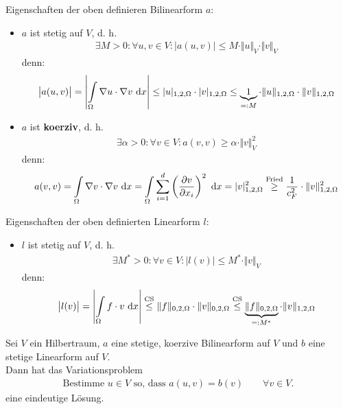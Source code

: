 Eigenschaften der oben definieren Bilinearform $a$:
\begin{itemize}
	\item $a$ ist stetig auf $V$, d. h.
	\begin{align*}
		\exists M>0:\forall u,v\in V:\big|a(u,v)\big|\leq M\cdot\Vert u\Vert_V\cdot\Vert v\Vert_V
	\end{align*}
	denn:
	\begin{align*}
		\big| a(u,v)\big|=\left|\int\limits_\Omega\nabla u\cdot\nabla v\text{ d} x\right|
		\leq
		|u|_{1,2,\Omega}\cdot|v|_{1,2,\Omega}
		\leq
		\underbrace{1}_{=:M}\cdot\Vert u\Vert_{1,2,\Omega}\cdot\Vert v\Vert_{1,2,\Omega}
	\end{align*}
	\item $a$ ist \textbf{koerziv}, d. h.
	\begin{align*}
		\exists\alpha>0:\forall v\in V:a(v,v)\geq\alpha\cdot\Vert v\Vert^2_V
	\end{align*} 
	denn:
	\begin{align*}
		a(v,v)
		=\int\limits_\Omega\nabla v\cdot\nabla v\text{ d} x
		=\int\limits_\Omega\sum\limits_{i=1}^d\left(\frac{\partial v}{\partial x_i}\right)^2\text{ d} x
		=|v|^2_{1,2,\Omega}
		\stackrel{\text{Fried}}{\geq}
		\frac{1}{c_F^2}\cdot\Vert v\Vert^2_{1,2,\Omega}
	\end{align*}
\end{itemize}

Eigenschaften der oben definierten Linearform $l$:
\begin{itemize}
	\item $l$ ist stetig auf $V$, d. h.
	\begin{align*}
		\exists M^\ast>0:\forall v\in V: \big|l(v)\big|\leq M^\ast\cdot\Vert v\Vert_V
	\end{align*}
	denn:
	\begin{align*}
		\big| l(v)\big|=\left|\int\limits_\Omega f\cdot v\text{ d} x\right|
		\stackrel{\text{CS}}{\leq}
		\Vert f\Vert_{0,2,\Omega}\cdot\Vert v\Vert_{0,2,\Omega}
		\stackrel{\text{CS}}{\leq}
		\underbrace{\Vert f\Vert_{0,2,\Omega}}_{=:M^\ast}\cdot\Vert v\Vert_{1,2,\Omega}
	\end{align*}
\end{itemize}

\begin{theorem}\label{theorem2.1LaxMilgram}\enter
	Sei $V$ ein Hilbertraum, $a$ eine stetige, koerzive Bilinearform auf $V$ und $b$ eine stetige Linearform auf $V$.\\
	Dann hat das Variationsproblem
	\begin{align*}
		\text{Bestimme $u\in V$ so, dass }a(u,v)=b(v)\qquad\forall v\in V.
	\end{align*}
	eine eindeutige Lösung.
\end{theorem}

